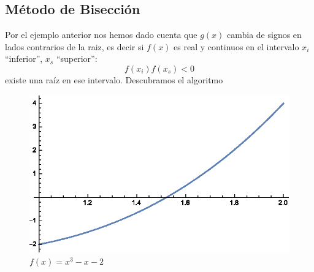 \documentclass{beamer}
\begin{document}
\subsection{Método de Bisección}

\begin{frame}
	Por el ejemplo anterior nos hemos dado cuenta que $ g(x) $ cambia de signos en lados contrarios de la raiz, es decir si $ f(x) $ es real y continuos en el intervalo $ x_{i} $ ``inferior'', $ x_{s} $ ``superior'':
	\[ f(x_i)f(x_s) < 0 \]
	existe una raíz en ese intervalo.
	Descubramos el algoritmo
	\begin{enumerate}
		\begin{itemize}
		\end{itemize}
		
	\end{enumerate}
\end{frame}


\begin{frame}[fragile]
	\begin{figure}
		\includegraphics{Graph3}
		\caption{$ f(x) = x^3 - x -2 $}
	\end{figure}
\end{frame}
\end{document}
